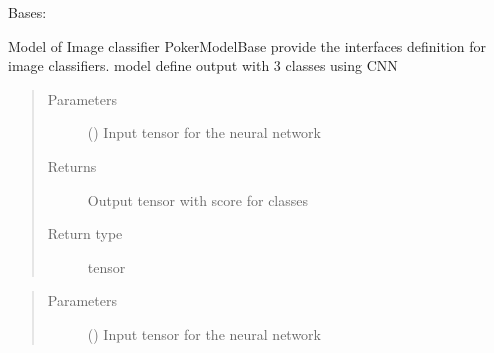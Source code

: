 \documentclass[letterpaper,10pt,english]{sphinxmanual}
\begin{document}
\begin{fulllineitems}
\label{\detokenize{models:models.CNN3.model}}
\pysigstartsignatures
{}
\pysigstopsignatures
\sphinxAtStartPar
Bases: {\hyperref[\detokenize{models:models.base_model.PokerModelBase}]{}}

\sphinxAtStartPar
Model of Image classifier
PokerModelBase provide the interfaces definition for image classifiers.
model define output with 3 classes using CNN

\begin{fulllineitems}
\label{\detokenize{models:models.CNN3.model.forward}}
\pysigstartsignatures
{}
\pysigstopsignatures\begin{quote}\begin{description}
\item[{Parameters}] \leavevmode
\sphinxAtStartPar
{} () \textendash{} Input tensor for the neural network

\item[{Returns}] \leavevmode
\sphinxAtStartPar
{} \textendash{} Output tensor with score for classes

\item[{Return type}] \leavevmode
\sphinxAtStartPar
tensor

\end{description}\end{quote}

\end{fulllineitems}


\begin{fulllineitems}
\label{\detokenize{models:models.CNN3.model.predict}}
\pysigstartsignatures
{}
\pysigstopsignatures\begin{quote}\begin{description}
\item[{Parameters}] \leavevmode
\sphinxAtStartPar
{} () \textendash{} Input tensor for the neural network


\end{description}
\end{quote}
\end{fulllineitems}
\end{fulllineitems}
\end{document}
